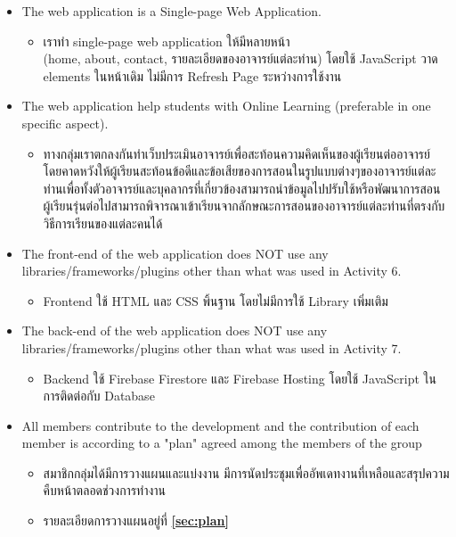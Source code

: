\documentclass[17pt]{extarticle}
\begin{document}
\begin{itemize}
    \item The web application is a Single-page Web Application.
          \begin{itemize}
              \item เราทำ single-page web application ให้มีหลายหน้า \\(home, about, contact, รายละเอียดของอาจารย์แต่ละท่าน) โดยใช้ JavaScript วาด elements ในหน้าเดิม ไม่มีการ Refresh Page ระหว่างการใช้งาน
          \end{itemize}
    \item The web application help students with Online Learning (preferable in one specific aspect).
          \begin{itemize}
              \item ทางกลุ่มเราตกลงกันทำเว็บประเมินอาจารย์เพื่อสะท้อนความคิดเห็นของผู้เรียนต่ออาจารย์ โดยคาดหวังให้ผู้เรียนสะท้อนข้อดีและข้อเสียของการสอนในรูปแบบต่างๆของอาจารย์แต่ละท่านเพื่อทั้งตัวอาจารย์และบุคลากรที่เกี่ยวข้องสามารถนำข้อมูลไปปรับใช้หรือพัฒนาการสอน ผู้เรียนรุ่นต่อไปสามารถพิจารณาเข้าเรียนจากลักษณะการสอนของอาจารย์แต่ละท่านที่ตรงกับวิธีการเรียนของแต่ละคนได้
          \end{itemize}
    \item The front-end of the web application does NOT use any libraries/frameworks/plugins other than what was used in Activity 6.
          \begin{itemize}
              \item Frontend ใช้ HTML และ CSS พิ้นฐาน โดยไม่มีการใช้ Library เพิ่มเติม
          \end{itemize}
    \item The back-end of the web application does NOT use any libraries/frameworks/plugins other than what was used in Activity 7.
          \begin{itemize}
              \item Backend ใช้ Firebase Firestore และ Firebase Hosting โดยใช้ JavaScript ในการติดต่อกับ Database
          \end{itemize}
    \item All members contribute to the development and the contribution of each member is according to a "plan" agreed among the members of the group
          \begin{itemize}
              \item สมาชิกกลุ่มได้มีการวางแผนและแบ่งงาน มีการนัดประชุมเพื่ออัพเดทงานที่เหลือและสรุปความคืบหน้าตลอดช่วงการทำงาน
              \item รายละเอียดการวางแผนอยู่ที่ \textbf{\autoref{sec:plan}}
          \end{itemize}
\end{itemize}
\end{document}
